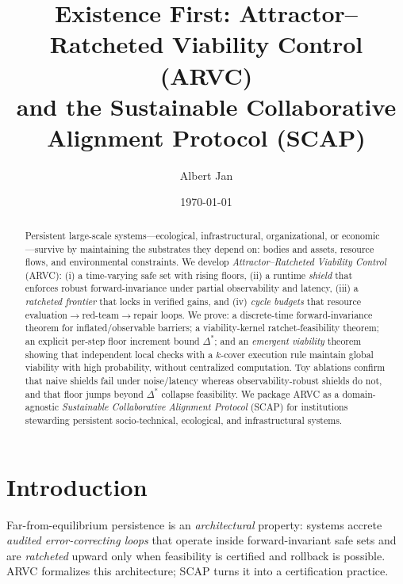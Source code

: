 \documentclass[11pt]{article}
\title{\vspace{-0.5em}
\Large Existence First: Attractor--Ratcheted Viability Control (ARVC)\\[0.25em]
\large and the Sustainable Collaborative Alignment Protocol (SCAP)}
\author{\normalsize Albert Jan}
\date{\normalsize \today}
\theoremstyle{definition}
\begin{document}
\maketitle

\begin{abstract}
Persistent large-scale systems---ecological, infrastructural, organizational, or economic---survive by maintaining the substrates they depend on: bodies and assets, resource flows, and environmental constraints. We develop \emph{Attractor--Ratcheted Viability Control} (ARVC): (i) a time-varying safe set with rising floors, (ii) a runtime \emph{shield} that enforces robust forward-invariance under partial observability and latency, (iii) a \emph{ratcheted frontier} that locks in verified gains, and (iv) \emph{cycle budgets} that resource evaluation$\to$red-team$\to$repair loops. We prove: a discrete-time forward-invariance theorem for inflated/observable barriers; a viability-kernel ratchet-feasibility theorem; an explicit per-step floor increment bound $\Delta^\ast$; and an \emph{emergent viability} theorem showing that independent local checks with a $k$-cover execution rule maintain global viability with high probability, without centralized computation. Toy ablations confirm that naive shields fail under noise/latency whereas observability-robust shields do not, and that floor jumps beyond $\Delta^\ast$ collapse feasibility. We package ARVC as a domain-agnostic \emph{Sustainable Collaborative Alignment Protocol} (SCAP) for institutions stewarding persistent socio-technical, ecological, and infrastructural systems.
\end{abstract}

\section{Introduction}
Far-from-equilibrium persistence is an \emph{architectural} property: systems accrete \emph{audited error-correcting loops} that operate inside forward-invariant safe sets and are \emph{ratcheted} upward only when feasibility is certified and rollback is possible. ARVC formalizes this architecture; SCAP turns it into a certification practice.
\end{document}
